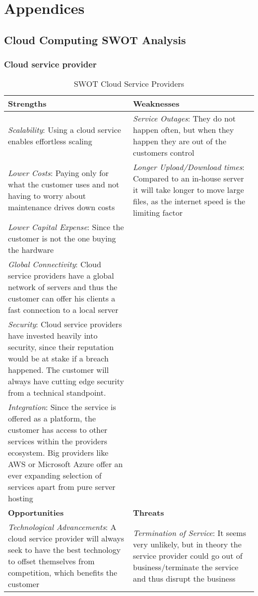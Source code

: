 \section{Appendices}
\label{sec:app}

\subsection{Cloud Computing SWOT Analysis}
\label{ssec:swot}
\subsubsection{Cloud service provider}

\renewcommand{\arraystretch}{1.5}
\begin{longtable}{ | p{0.5\linewidth} | p{0.5\linewidth} | } 
\caption{SWOT Cloud Service Providers} \\
 \hline
\textbf{Strengths} & \textbf{Weaknesses}\\ 
\hline
\textit{Scalability}: Using a cloud service enables effortless scaling & \textit{Service Outages}: They do not happen often, but when they happen they are out of the customers control \\ 
\textit{Lower Costs}: Paying only for what the customer uses and not having to worry about maintenance drives down costs & \textit{Longer Upload/Download times}:  Compared to an in-house server it will take longer to move large files, as the internet speed is the limiting factor\\
\textit{Lower Capital Expense}: Since the customer is not the one buying the hardware & \\ 
 \textit{Global Connectivity}: Cloud service providers have a global network of servers and thus the customer can offer his clients a fast connection to a local server & \\
 \textit{Security}: Cloud service providers have invested heavily into security, since their reputation would be at stake if a breach happened. The customer will always have cutting edge security from a technical standpoint. & \\
 \textit{Integration}: Since the service is offered as a platform, the customer has access to other services within the providers ecosystem. Big providers like AWS or Microsoft Azure offer an ever expanding selection of services apart from pure server hosting & \\
 \hline
 \textbf{Opportunities} & \textbf{Threats}  \\ 
 \hline
\textit{Technological Advancements}: A cloud service provider will always seek to have the best technology to offset themselves from competition, which benefits the customer & \textit{Termination of Service}: It seems very unlikely, but in theory the service provider could go out of business/terminate the service and thus disrupt the business \\
\hline 
\end{longtable}

